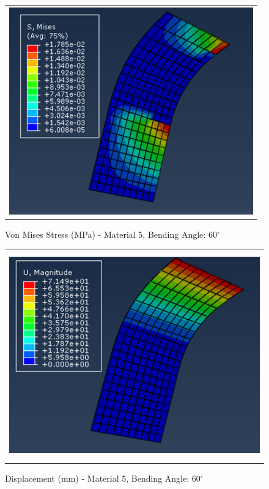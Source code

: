 \documentclass[a4paper,12pt]{article}
\numberwithin{equation}{section}
\numberwithin{figure}{section}
\begin{document}
\begin{figure}[H]
  \centering
  \begin{tabular}{@{}c@{}}
    \includegraphics[width=0.7\linewidth,height=255pt]{Results/Bending/M5_VMS_60.png} \\
  \end{tabular}
  \caption{Von Mises Stress (MPa) - Material 5,  Bending Angle: 60$^{\circ}$ }
\end{figure}

\begin{figure}[H]
  \centering
  \begin{tabular}{@{}c@{}}
    \includegraphics[width=0.7\linewidth,height=255pt]{Results/Bending/M5_DIS_60.png} \\
  \end{tabular}
  \caption{Displacement (mm) - Material 5, Bending Angle: 60$^{\circ}$ }
\end{figure}
\end{document}
